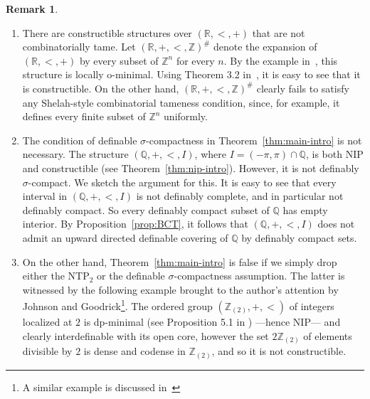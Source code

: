 \documentclass[12pt]{article}
\newcommand{\R}{\mathbb{R}}
\newcommand{\N}{\mathbb{N}}
\newcommand{\Z}{\mathbb{Z}}
\newcommand{\Q}{\mathbb{Q}}
\newcommand{\NIP}{\ensuremath{\mathrm{NIP}}}
\newcommand{\NTP}{\ensuremath{\mathrm{NTP}_2}}
\theoremstyle{definition}
\newtheorem{remark}[theorem]{Remark}
\theoremstyle{remark}
\begin{document}
\begin{remark}\label{rem:TP2-cons}
\begin{enumerate}
\item There are constructible structures over $(\R,<,+)$ that are not combinatorially tame. Let $(\R,+,<, \Z)^\#$ denote the expansion of $(\R,<,+)$ by every subset of $\Z^n$ for every $n$. By the example in~\cite[page 56]{FM01-sparse}, this structure is locally o-minimal. Using Theorem 3.2 in~\cite{miller05-tame}, it is easy to see that it is constructible. On the other hand, $(\R,+,<, \Z)^\#$ clearly fails to satisfy any Shelah-style combinatorial tameness condition, since, for example, it defines every finite subset of $\Z^n$ uniformly.  

\item The condition of definable $\sigma$-compactness in Theorem~\ref{thm:main-intro} is not necessary. The structure $(\Q,+,<,I)$, where $I=(-\pi,\pi)\cap \Q$, is both $\NIP$ and constructible (see Theorem~\ref{thm:nip-intro}). However, it is not definably $\sigma$-compact. We sketch the argument for this. It is easy to see that every interval in $(\Q,+,<,I)$ is not definably complete, and in particular not definably compact. So every definably compact subset of $\Q$ has empty interior. By Proposition~\ref{prop:BCT}, it follows that $(\Q,+,<,I)$ does not admit an upward directed definable covering of $\Q$ by definably compact sets. 

\item On the other hand, Theorem~\ref{thm:main-intro} is false if we simply drop either the $\NTP$ or the definable $\sigma$-compactness assumption. The latter is witnessed by the following example brought to the author's attention by Johnson and Goodrick\footnote{A similar example is discussed in~\cite{goo10}}. The ordered group $(\Z_{(2)},+,<)$ of integers localized at $2$ is dp-minimal (see Proposition 5.1 in \cite{JSW-valued-fields}) ---hence $\NIP$--- and clearly interdefinable with its open core, however the set $2\Z_{(2)}$ of elements divisible by $2$ is dense and codense in $\Z_{(2)}$, and so it is not constructible. 
\end{enumerate}
\end{remark}
\end{document}
